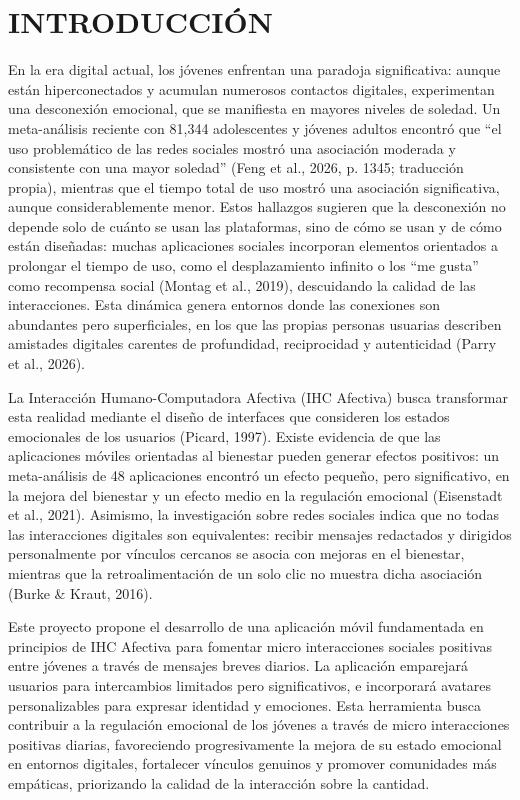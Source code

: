 \chapter{INTRODUCCIÓN}
En la era digital actual, los jóvenes enfrentan una paradoja significativa: aunque están hiperconectados y acumulan numerosos contactos digitales, experimentan una desconexión emocional, que se manifiesta en mayores niveles de soledad. Un meta-análisis reciente con 81,344 adolescentes y jóvenes adultos encontró que ``el uso problemático de las redes sociales mostró una asociación moderada y consistente con una mayor soledad'' (Feng et al., 2026, p. 1345; traducción propia), mientras que el tiempo total de uso mostró una asociación significativa, aunque considerablemente menor. Estos hallazgos sugieren que la desconexión no depende solo de cuánto se usan las plataformas, sino de cómo se usan y de cómo están diseñadas: muchas aplicaciones sociales incorporan elementos orientados a prolongar el tiempo de uso, como el desplazamiento infinito o los ``me gusta'' como recompensa social (Montag et al., 2019), descuidando la calidad de las interacciones. Esta dinámica genera entornos donde las conexiones son abundantes pero superficiales, en los que las propias personas usuarias describen amistades digitales carentes de profundidad, reciprocidad y autenticidad (Parry et al., 2026).

La Interacción Humano-Computadora Afectiva (IHC Afectiva) busca transformar esta realidad mediante el diseño de interfaces que consideren los estados emocionales de los usuarios (Picard, 1997). Existe evidencia de que las aplicaciones móviles orientadas al bienestar pueden generar efectos positivos: un meta-análisis de 48 aplicaciones encontró un efecto pequeño, pero significativo, en la mejora del bienestar y un efecto medio en la regulación emocional (Eisenstadt et al., 2021). Asimismo, la investigación sobre redes sociales indica que no todas las interacciones digitales son equivalentes: recibir mensajes redactados y dirigidos personalmente por vínculos cercanos se asocia con mejoras en el bienestar, mientras que la retroalimentación de un solo clic no muestra dicha asociación (Burke \& Kraut, 2016).

Este proyecto propone el desarrollo de una aplicación móvil fundamentada en principios de IHC Afectiva para fomentar micro interacciones sociales positivas entre jóvenes a través de mensajes breves diarios. La aplicación emparejará usuarios para intercambios limitados pero significativos, e incorporará avatares personalizables para expresar identidad y emociones. Esta herramienta busca contribuir a la regulación emocional de los jóvenes a través de micro interacciones positivas diarias, favoreciendo progresivamente la mejora de su estado emocional en entornos digitales, fortalecer vínculos genuinos y promover comunidades más empáticas, priorizando la calidad de la interacción sobre la cantidad.

